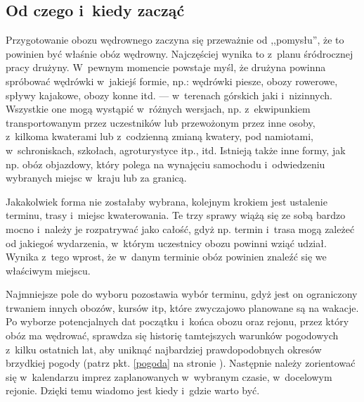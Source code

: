 \documentclass[a5paper,10pt,titlepage,twoside]{article}
\begin{document}
\subsection{Od czego i~kiedy zacząć}
Przygotowanie obozu wędrownego zaczyna się przeważnie od ,,pomysłu'', że to powinien być właśnie obóz wędrowny. Najczęściej wynika to z~planu śródrocznej pracy drużyny. W~pewnym momencie powstaje myśl, że drużyna powinna spróbować wędrówki w~jakiejś formie, np.: wędrówki piesze, obozy rowerowe, spływy kajakowe, obozy konne itd. --- w~terenach górskich jaki i~nizinnych. Wszystkie one mogą wystąpić w~różnych wersjach, np. z~ekwipunkiem transportowanym przez uczestników lub przewożonym przez inne osoby, z~kilkoma kwaterami lub z~codzienną zmianą kwatery, pod namiotami, w~schroniskach, szkołach, agroturystyce itp., itd. Istnieją także inne formy, jak np. obóz objazdowy, który polega na wynajęciu samochodu i~odwiedzeniu wybranych miejsc w~kraju lub za granicą.

Jakakolwiek forma nie zostałaby wybrana, kolejnym krokiem jest ustalenie terminu, trasy i~miejsc kwaterowania. Te trzy sprawy wiążą się ze sobą bardzo mocno i~należy je rozpatrywać jako całość, gdyż np. termin i~trasa mogą zależeć od jakiegoś wydarzenia, w~którym uczestnicy obozu powinni wziąć udział. Wynika z~tego wprost, że w~danym terminie obóz powinien znaleźć się we właściwym miejscu.

Najmniejsze pole do wyboru pozostawia wybór terminu, gdyż jest on ograniczony trwaniem innych obozów, kursów itp, które zwyczajowo planowane są na wakacje. Po wyborze potencjalnych dat początku i~końca obozu oraz rejonu, przez który obóz ma wędrować, sprawdza się historię tamtejszych warunków pogodowych z~kilku ostatnich lat, aby uniknąć najbardziej prawdopodobnych okresów brzydkiej pogody (patrz pkt. \ref{pogoda} na stronie \pageref{pogoda}). Następnie należy zorientować się w~kalendarzu imprez zaplanowanych w~wybranym czasie, w~docelowym rejonie. Dzięki temu wiadomo jest kiedy i~gdzie warto być.
\end{document}
